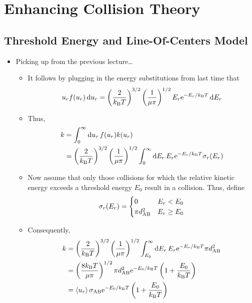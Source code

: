 \documentclass[../notes.tex]{subfiles}
\begin{document}
\chapter{Enhancing Collision Theory}
\section{Threshold Energy and Line-Of-Centers Model}
\begin{itemize}
    \item {}Picking up from the previous lecture\dots
    \begin{itemize}
        \item It follows by plugging in the energy substitutions from last time that
        \begin{equation*}
            u_rf(u_r)\dd{u_r} = \left( \frac{2}{\kB T} \right)^{3/2}\left( \frac{1}{\mu\pi} \right)^{1/2}E_r\e[-E_r/\kB T]\dd{E_r}
        \end{equation*}
        \item Thus,
        \begin{align*}
            k &= \int_0^\infty\dd{u_r}f(u_r)k(u_r)\\
            &= \left( \frac{2}{\kB T} \right)^{3/2}\left( \frac{1}{\mu\pi} \right)^{1/2}\int_0^\infty\dd{E_r}E_r\e[-E_r/\kB T]\sigma_r(E_r)
        \end{align*}
        \item Now assume that only those collisions for which the relative kinetic energy exceeds a threshold energy $E_0$ result in a collision. Thus, define
        \begin{equation*}
            \sigma_r(E_r) =
            \begin{cases}
                0 & E_r<E_0\\
                \pi d_{\ce{A}\ce{B}}^2 & E_r\geq E_0
            \end{cases}
        \end{equation*}
        \item Consequently,
        \begin{align*}
            k &= \left( \frac{2}{\kB T} \right)^{3/2}\left( \frac{1}{\mu\pi} \right)^{1/2}\int_{E_0}^\infty\dd{E_r}E_r\e[-E_r/\kB T]\pi d_{\ce{A}\ce{B}}^2\\
            &= \left( \frac{8\kB T}{\mu\pi} \right)^{1/2}\pi d_{\ce{A}\ce{B}}^2\e[-E_0/\kB T]\left( 1+\frac{E_0}{\kB T} \right)\\
            &= \prb{u_r}\sigma_{\ce{A}\ce{B}}\e[-E_0/\kB T]\left( 1+\frac{E_0}{\kB T} \right)

\end{align*}
\end{itemize}
\end{itemize}
\end{document}

